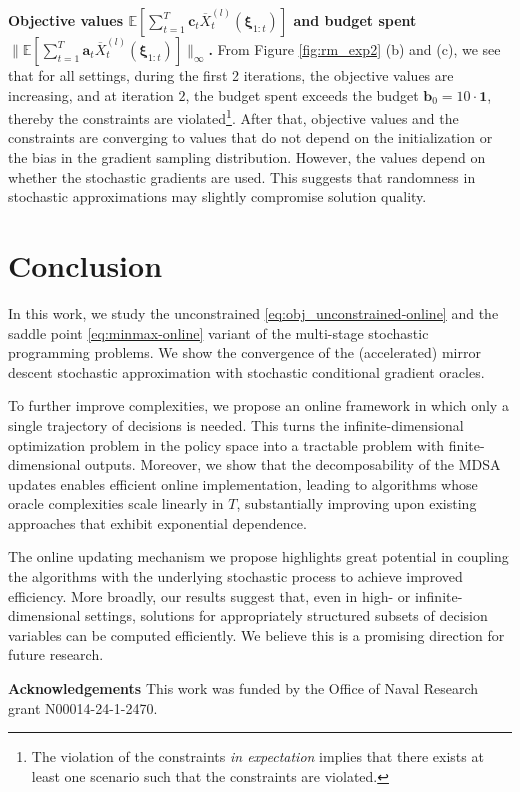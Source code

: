 \documentclass[11pt,fullpage,letterpaper]{article}
\newcommand{\mb}{\mathbf}
\newcommand{\E}{\mathbb{E}}
\newcommand{\bx}{\boldsymbol{\xi}}
\begin{document}
\textbf{Objective values $\E[\sum_{t=1}^T \mb c_t \overline{X}_{t}^{(l)}(\bx_{1:t})]$ and budget spent $\|\E[\sum_{t=1}^T \mb a_t \overline{X}_{t}^{(l)}(\bx_{1:t})]\|_{\infty}$.} From Figure \ref{fig:rm_exp2} (b) and (c), we see that for all settings, during the first 2 iterations, the objective values are increasing, and at iteration $2$, the budget spent exceeds the budget $\mb b_0 = 10 \cdot \mb 1$, thereby the constraints are violated\footnote{The violation of the constraints \textit{in expectation} implies that there exists at least one scenario such that the constraints are violated. }. After that, objective values and the constraints are converging to values that do not depend on the initialization or the bias in the gradient sampling distribution. However, the values depend on whether the stochastic gradients are used. This suggests that randomness in stochastic approximations may slightly compromise solution quality.

\section{Conclusion}
In this work, we study the unconstrained \eqref{eq:obj_unconstrained-online} and the saddle point \eqref{eq:minmax-online} variant of the multi-stage stochastic programming problems. We show the convergence of the (accelerated) mirror descent stochastic approximation with stochastic conditional gradient oracles. 

To further improve complexities, we propose an online framework in which only a single trajectory of decisions is needed. This turns the infinite-dimensional optimization problem in the policy space into a tractable problem with finite-dimensional outputs. Moreover, we show that the decomposability of the MDSA updates enables efficient online implementation, leading to algorithms whose oracle complexities scale linearly in $T$, substantially improving upon existing approaches that exhibit exponential dependence.

The online updating mechanism we propose highlights great potential in coupling the algorithms with the underlying stochastic process to achieve improved efficiency. More broadly, our results suggest that, even in high- or infinite-dimensional settings, solutions for appropriately structured subsets of decision variables can be computed efficiently. We believe this is a promising direction for future research.




\textbf{Acknowledgements}
This work was funded by the Office of Naval Research grant N00014-24-1-2470.
\end{document}
